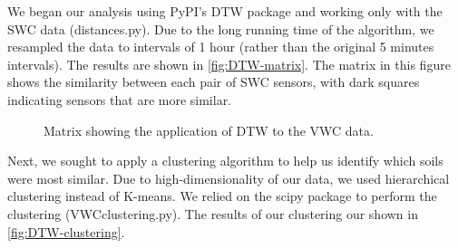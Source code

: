 \documentclass[12pt]{scrartcl}
\begin{document}
We began our analysis using PyPI's DTW package and working only with the SWC data (distances.py). Due to the long running time of the algorithm, we resampled the data to intervals of 1 hour (rather than the original 5 minutes intervals). The results are shown in \autoref{fig:DTW-matrix}. The matrix in this figure shows the similarity between each pair of SWC sensors, with dark squares indicating sensors that are more similar.

\begin{figure}[!htb]
        \caption{\label{fig:DTW-matrix} Matrix showing the application of DTW to the VWC data.}
\end{figure}

Next, we sought to apply a clustering algorithm to help us identify which soils were most similar. Due to high-dimensionality of our data, we used hierarchical clustering instead of K-means. We relied on the scipy package to perform the clustering (VWCclustering.py). The results of our clustering our shown in \autoref{fig:DTW-clustering}.
\end{document}
